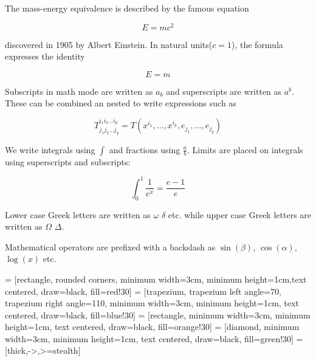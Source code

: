 The mass-energy equivalence is described by the famous equation 

$$E=mc^2$$

discovered in 1905 by Albert Einstein.
In natural units($c = 1$), the formula expresses the identity

\begin{equation}
E=m
\end{equation}

Subscripts in math mode are written as $a_b$ and superscripts are written as $a^b$. 
These can be combined an nested to write expressions such as

$$T^{i_1 i_2 \dots i_p}_{j_1 j_2 \dots j_q} = T(x^{i_1},\dots,x^{i_p},e_{j_1},\dots,e_{j_q})$$

We write integrals using $\int$ and fractions using $\frac{a}{b}$. 
Limits are placed on integrals using superscripts and subscripts:

$$\int_0^1 \frac{1}{e^x} =  \frac{e-1}{e}$$

Lower case Greek letters are written as $\omega$ $\delta$ etc. 
while upper case Greek letters are written as $\Omega$ $\Delta$.

Mathematical operators are prefixed with a backslash as $\sin(\beta)$, $\cos(\alpha)$, $\log(x)$ etc.

 = [rectangle, rounded corners, minimum width=3cm, minimum height=1cm,text centered, draw=black, fill=red!30]
 = [trapezium, trapezium left angle=70, trapezium right angle=110, minimum width=3cm, minimum height=1cm, text centered, draw=black, fill=blue!30]
 = [rectangle, minimum width=3cm, minimum height=1cm, text centered, draw=black, fill=orange!30]
 = [diamond, minimum width=3cm, minimum height=1cm, text centered, draw=black, fill=green!30]
 = [thick,->,>=stealth]


